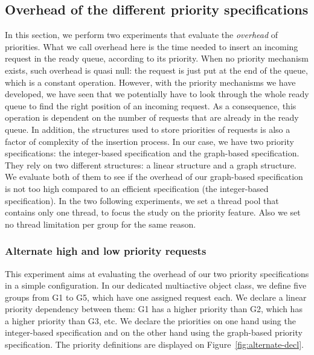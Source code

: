 \documentclass[11pt]{report}
\begin{document}
\subsection{Overhead of the different priority specifications}
In this section, we perform two experiments that evaluate the \emph{overhead} of priorities. What we call overhead here is the time needed to insert an incoming request in the ready queue, according to its priority. When no priority mechanism exists, such overhead is quasi null: the request is just put at the end of the queue, which is a constant operation. However, with the priority mechanisms we have developed, we have seen that we potentially have to look through the whole ready queue to find the right position of an incoming request. As a consequence, this operation is dependent on the number of requests that are already in the ready queue. In addition, the structures used to store priorities of requests is also a factor of complexity of the insertion process. In our case, we have two priority specifications: the integer-based specification and the graph-based specification. They rely on two different structures: a linear structure and a graph structure. We evaluate both of them to see if the overhead of our graph-based specification is not too high compared to an efficient specification (the integer-based specification). In the two following experiments, we set a thread pool that contains only one thread, to focus the study on the priority feature. Also we set no thread limitation per group for the same reason.

\subsubsection{Alternate high and low priority requests}
This experiment aims at evaluating the overhead of our two priority specifications in a simple configuration. In our dedicated multiactive object class, we define five groups from G1 to G5, which have one assigned request each. We declare a linear priority dependency between them: G1 has a higher priority than G2, which has a higher priority than G3, etc. We declare the priorities on one hand using the integer-based specification and on the other hand using the graph-based priority specification. The priority definitions are displayed on Figure~\ref{fig:alternate-decl}.
\end{document}
